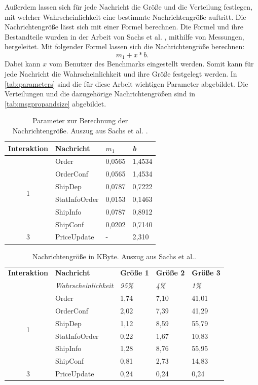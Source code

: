 Außerdem lassen sich für jede Nachricht die Größe und die Verteilung festlegen, mit welcher Wahrscheinlichkeit eine bestimmte Nachrichtengröße auftritt. Die Nachrichtengröße lässt sich mit einer Formel berechnen. Die Formel und ihre Bestandteile wurden in der Arbeit von Sachs et al. \cite{Sachs2013}, mithilfe von Messungen, hergeleitet. Mit folgender Formel lassen sich die Nachrichtengröße berechnen: 
\[m_1 + x * b .\] 
Dabei kann $x$ vom Benutzer des Benchmarks eingestellt werden. Somit kann für jede Nachricht die Wahrscheinlichkeit und ihre Größe festgelegt werden. In \autoref{tab:parameters} sind die für diese Arbeit wichtigen Parameter abgebildet. Die Verteilungen und die dazugehörige Nachrichtengrößen sind in \autoref{tab:msgpropandsize} abgebildet.


\begin{table}
\center
  \begin{tabular}{|c|l|l|l|}
  \hline
    \textbf{Interaktion} & \textbf{Nachricht} & \textit{\(m_1\)} & \textit{b}  \\
    \hline \hline
    \multirow{6}{*}{1} & Order & 0,0565 & 1,4534 \\\cline{2-4}
    & OrderConf & 0,0565 & 1,4534 \\\cline{2-4}
    & ShipDep & 0,0787 & 0,7222 \\\cline{2-4}
    & StatInfoOrder & 0,0153 & 0,1463 \\\cline{2-4}
    & ShipInfo & 0,0787 & 0,8912 \\\cline{2-4}
    & ShipConf & 0,0202 & 0,7140  \\\hline
    \hline
     3 & PriceUpdate & - & 2,310 \\\hline
  \end{tabular}
	\caption{\label{tab:parameters} Parameter zur Berechnung der Nachrichtengröße. Auszug aus Sachs et al. \cite{Sachs2013}.}
\end{table}

\begin{table}
\center
  \begin{tabular}{|c|l|l|l|l|}
  \hline
    \textbf{Interaktion} & \textbf{Nachricht} & \textbf{Größe 1} & \textbf{Größe 2} &\textbf{Größe 3} \\
     & \textit{Wahrscheinlichkeit} & \textit{95\%}  & \textit{4\%} &\textit{1\%}   \\
    \hline \hline
    \multirow{6}{*}{1} & Order & 1,74 & 7,10 & 41,01 \\\cline{2-5}
    & OrderConf & 2,02 & 7,39 & 41,29 \\\cline{2-5}
    & ShipDep & 1,12 & 8,59 & 55,79\\\cline{2-5}
    & StatInfoOrder & 0,22 & 1,67 & 10,83 \\\cline{2-5}
    & ShipInfo & 1,28 & 8,76 & 55,95 \\\cline{2-5}
    & ShipConf & 0,81 & 2,73 & 14,83  \\\hline
    \hline
     3 & PriceUpdate & 0,24 & 0,24 & 0,24 \\\hline
  \end{tabular}
	\caption{\label{tab:msgpropandsize} Nachrichtengröße in KByte. Auszug aus Sachs et al.\cite{Sachs2013}.}
\end{table}

